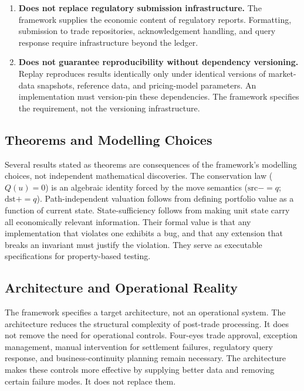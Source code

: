 \begin{enumerate}
\item \textbf{Does not replace regulatory submission infrastructure.} The framework supplies the economic content of regulatory reports. Formatting, submission to trade repositories, acknowledgement handling, and query response require infrastructure beyond the ledger.

\item \textbf{Does not guarantee reproducibility without dependency versioning.} Replay reproduces results identically only under identical versions of market-data snapshots, reference data, and pricing-model parameters. An implementation must version-pin these dependencies. The framework specifies the requirement, not the versioning infrastructure.
\end{enumerate}

\subsection{Theorems and Modelling Choices}

Several results stated as theorems are consequences of the framework's modelling choices, not independent mathematical discoveries. The conservation law ($Q(u)=0$) is an algebraic identity forced by the move semantics ($\mathrm{src}\mathbin{{-}{=}}q$; $\mathrm{dst}\mathbin{{+}{=}}q$). Path-independent valuation follows from defining portfolio value as a function of current state. State-sufficiency follows from making unit state carry all economically relevant information. Their formal value is that any implementation that violates one exhibits a bug, and that any extension that breaks an invariant must justify the violation. They serve as executable specifications for property-based testing.

\subsection{Architecture and Operational Reality}

The framework specifies a target architecture, not an operational system. The architecture reduces the structural complexity of post-trade processing. It does not remove the need for operational controls. Four-eyes trade approval, exception management, manual intervention for settlement failures, regulatory query response, and business-continuity planning remain necessary. The architecture makes these controls more effective by supplying better data and removing certain failure modes. It does not replace them.

\clearpage

